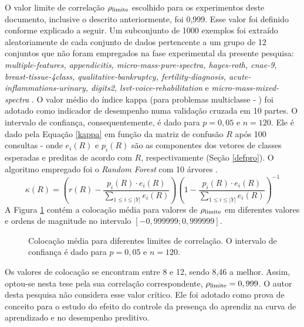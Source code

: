 O valor limite de correlação $\rho_{\operatorname*{limite}}$ escolhido para os experimentos deste documento, inclusive o descrito anteriormente, foi 0,999.
Esse valor foi definido conforme explicado a seguir.
Um subconjunto de 1000 exemplos foi extraído aleatoriamente de cada conjunto de dados pertencente a um grupo de 12 conjuntos que não foram empregados na fase experimental da presente pesquisa:
\textit{multiple-features, appendicitis, micro-mass-pure-spectra, hayes-roth, cnae-9, breast-tissue-4class, qualitative-bankruptcy, fertility-diagnosis, acute-inflammations-urinary, digits2, lsvt-voice-rehabilitation} e \textit{micro-mass-mixed-spectra} \cite{bache2013uci}.
O valor médio do índice kappa (para problemas multiclasse - \cite{fleiss2013statistical,conf/pkdd/Shah11})
foi adotado como indicador de desempenho numa validação cruzada em 10 partes.
O intervalo de confiança, consequentemente, é dado para $p=0,05$ e $n=120$.
Ele é dado pela Equação \ref{kappa} em função da matriz de confusão $R$ após 100 consultas - onde $e_i(R)$ e $p_i(R)$ são as componentes dos vetores de classes esperadas e preditas de acordo com $R$, respectivamente (Seção \ref{defpro}).
O algoritmo empregado foi o \textit{Random Forest} com 10 árvores \cite{journals/ml/Breiman01}.
\begin{equation} \label{kappa}
\kappa(R) = \left(r(R) - \frac{p_i(R) \cdot e_i(R)}{\sum\limits_{1\leq i \leq |Y|}e_i(R)}\right)\left(1 - \frac{p_i(R) \cdot e_i(R)}{\sum\limits_{1\leq i \leq |Y|}e_i(R)}\right)^{-1}
\end{equation}
A Figura \ref{hist} contém a colocação média para valores de $\rho_{\operatorname*{limite}}$ em diferentes valores e ordens de magnitude no intervalo $[-0,999999; 0,999999]$.
\begin{figure}
	\centering
	
	\caption[Colocação média para diferentes limites de correlação.]{Colocação média para diferentes limites de correlação. O intervalo de confiança é dado para $p=0,05$ e $n=120$.}
	\label{hist}
\end{figure}
Os valores de colocação se encontram entre 8 e 12, sendo 8,46 a melhor.
Assim, optou-se nesta tese pela sua correlação correspondente, $\rho_{\operatorname*{limite}} = 0,999$.
O autor desta pesquisa não considera esse valor crítico.
Ele foi adotado como prova de conceito para o estudo do efeito do controle da presença do aprendiz na curva de aprendizado e no desempenho preditivo.

